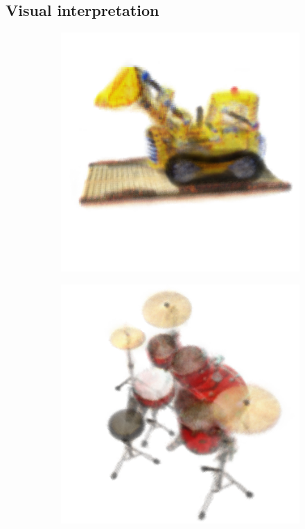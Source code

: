 \documentclass{article}
\begin{document}
\subsection{Visual interpretation}


\begin{figure}[!h]
 \centering

\begin{subfigure}{.24\textwidth}
  \centering
  \includegraphics[width=\linewidth]{figs/results/lego.png}  
\end{subfigure}
\begin{subfigure}{.24\textwidth}
  \centering
  \includegraphics[width=\linewidth]{figs/results/drums.png}  

\end{subfigure}
\end{figure}
\end{document}
